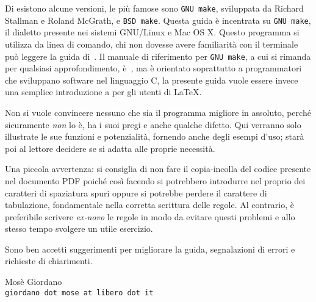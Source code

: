 Di  esistono alcune versioni, le più famose sono
\texttt{GNU make}, sviluppata da Richard Stallman e Roland McGrath, e
\texttt{BSD make}.  Questa guida è incentrata su \texttt{GNU make}, il dialetto
presente nei sistemi GNU/Linux e Mac OS X.  Questo programma si utilizza da
linea di comando, chi non dovesse avere familiarità con il terminale può leggere
la guida di~\cite{giacomelli:console}.  Il manuale di riferimento per
\texttt{GNU make}, a cui si rimanda per qualsiasi approfondimento,
è~\cite{gnu:make}, ma è orientato soprattutto a programmatori che sviluppano
software nel linguaggio C, la presente guida vuole essere invece una semplice
introduzione a  per gli utenti di \LaTeX{}.

Non si vuole convincere nessuno che  sia il programma migliore
in assoluto, perché sicuramente \emph{non} lo è, ha i suoi pregi e anche qualche
difetto.  Qui verranno solo illustrate le sue funzioni e potenzialità, fornendo
anche degli esempi d'uso; starà poi al lettore decidere se  si
adatta alle proprie necessità.

Una piccola avvertenza: si consiglia di non fare il copia-incolla del codice
presente nel documento \textsc{PDF} poiché così facendo si potrebbero introdurre
nel proprio  dei caratteri di spaziatura spuri oppure si
potrebbe perdere il carattere di tabulazione, fondamentale nella corretta
scrittura delle regole.  Al contrario, è preferibile scrivere \emph{ex-novo} le
regole in modo da evitare questi problemi e allo stesso tempo svolgere un utile
esercizio.

Sono ben accetti suggerimenti per migliorare la guida, segnalazioni di errori e
richieste di chiarimenti.

\begin{flushright}
\begin{minipage}{0.6\textwidth}\centering
Mosè Giordano \\
\texttt{giordano dot mose at libero dot it}
\end{minipage}
\end{flushright}

